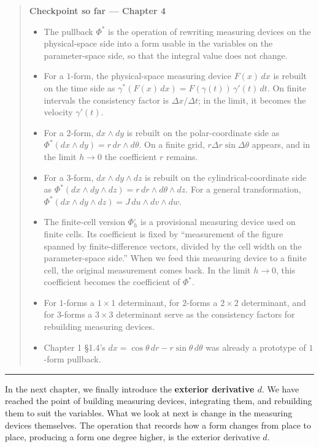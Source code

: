 \begin{quote}
\textbf{Checkpoint so far — Chapter 4}

\begin{itemize}
\item
  The pullback \(\Phi^*\) is the operation of rewriting measuring
  devices on the physical-space side into a form usable in the variables
  on the parameter-space side, so that the integral value does not
  change.
\item
  For a \(1\)-form, the physical-space measuring device \(F(x)\,dx\) is
  rebuilt on the time side as
  \(\gamma^*(F(x)\,dx)=F(\gamma(t))\,\gamma'(t)\,dt\). On finite
  intervals the consistency factor is \(\Delta x/\Delta t\); in the
  limit, it becomes the velocity \(\gamma'(t)\).
\item
  For a \(2\)-form, \(dx\wedge dy\) is rebuilt on the polar-coordinate
  side as \(\Phi^*(dx\wedge dy)=r\,dr\wedge d\theta\). On a finite grid,
  \(r\Delta r\sin\Delta\theta\) appears, and in the limit \(h\to0\) the
  coefficient \(r\) remains.
\item
  For a \(3\)-form, \(dx\wedge dy\wedge dz\) is rebuilt on the
  cylindrical-coordinate side as
  \(\Phi^*(dx\wedge dy\wedge dz)=r\,dr\wedge d\theta\wedge dz\). For a
  general transformation,
  \(\Phi^*(dx\wedge dy\wedge dz)=J\,du\wedge dv\wedge dw\).
\item
  The finite-cell version \(\Phi_h^\square\) is a provisional measuring
  device used on finite cells. Its coefficient is fixed by ``measurement
  of the figure spanned by finite-difference vectors, divided by the
  cell width on the parameter-space side.'' When we feed this measuring
  device to a finite cell, the original measurement comes back. In the
  limit \(h\to0\), this coefficient becomes the coefficient of
  \(\Phi^*\).
\item
  For \(1\)-forms a \(1\times1\) determinant, for \(2\)-forms a
  \(2\times2\) determinant, and for \(3\)-forms a \(3\times3\)
  determinant serve as the consistency factors for rebuilding measuring
  devices.
\item
  Chapter 1 §1.4's \(dx = \cos\theta\,dr - r\sin\theta\,d\theta\) was
  already a prototype of \(1\)-form pullback.
\end{itemize}
\end{quote}

\begin{center}\rule{0.5\linewidth}{0.5pt}\end{center}

In the next chapter, we finally introduce the
\textbf{exterior derivative $d$}. We have reached the point of building
measuring devices, integrating them, and rebuilding them to suit the
variables. What we look at next is change in the measuring devices
themselves. The operation that records how a form changes from place to
place, producing a form one degree higher, is the exterior derivative
\(d\).

